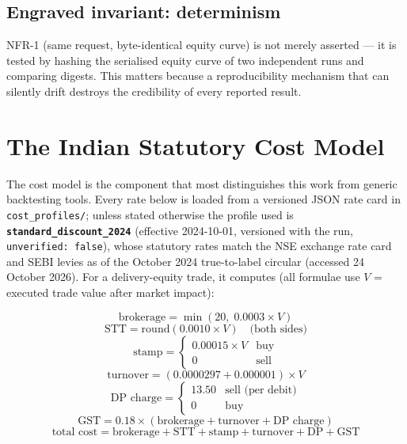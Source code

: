 \documentclass[12pt,a4paper,oneside]{report}
\begin{document}
\subsection{Engraved invariant: determinism}

NFR-1 (same request, byte-identical equity curve) is not merely asserted --- it
is tested by hashing the serialised equity curve of two independent runs and
comparing digests. This matters because a reproducibility mechanism that can
silently drift destroys the credibility of every reported result.

\section{The Indian Statutory Cost Model}

The cost model is the component that most distinguishes this work from generic
backtesting tools. Every rate below is loaded from a versioned JSON rate card in
\texttt{cost\_profiles/}; unless stated otherwise the profile used is
\textbf{\texttt{standard\_discount\_2024}} (effective 2024-10-01, versioned with
the run, \texttt{unverified: false}), whose statutory rates match the NSE
exchange rate card and SEBI levies \cite{nse} as of the October 2024
true-to-label circular (accessed 24 October 2026). For a delivery-equity trade,
it computes (all formulae use $V$ = executed trade value after market impact):

\begin{equation}
\text{brokerage} = \min\!\left(20,\; 0.0003 \times V\right)
\end{equation}
\begin{equation}
\text{STT} = \text{round}(0.0010 \times V) \quad \text{(both sides)}
\end{equation}
\begin{equation}
\text{stamp} = \begin{cases} 0.00015 \times V & \text{buy} \\ 0 & \text{sell} \end{cases}
\end{equation}
\begin{equation}
\text{turnover} = (0.0000297 + 0.000001) \times V
\end{equation}
\begin{equation}
\text{DP charge} = \begin{cases} 13.50 & \text{sell (per debit)} \\ 0 & \text{buy} \end{cases}
\end{equation}
\begin{equation}
\text{GST} = 0.18 \times (\text{brokerage} + \text{turnover} + \text{DP charge})
\end{equation}
\begin{equation}
\text{total cost} = \text{brokerage} + \text{STT} + \text{stamp} + \text{turnover} + \text{DP} + \text{GST}
\end{equation}
\end{document}
